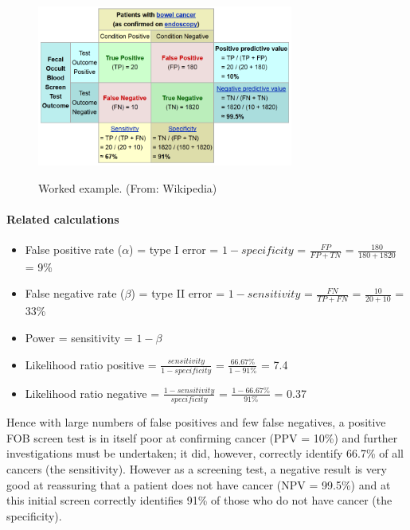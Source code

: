 \begin{figure}[ht]
  \centering
  \includegraphics[width=0.75\textwidth]{../Images/Sensitivity_Specificity_Example.png}\\
  \caption{Worked example. (From: Wikipedia)}\label{fig:sens_spec_example}
\end{figure}

\paragraph{Related calculations}

\begin{itemize}
  \item False positive rate ($\alpha$) = type I error = $1 - specificity$ = $\frac{FP}{FP + TN}$ = $\frac{180}{180+1820}$ = 9\%
  \item False negative rate ($\beta$) = type II error = $1 - sensitivity$ = $\frac{FN}{TP + FN}$ = $\frac{10}{20+10}$ = 33\%
  \item Power = sensitivity = $1−\beta$
  \item Likelihood ratio positive = $\frac{sensitivity}{1−specificity}$ = $\frac{66.67\%}{1−91\%}$ = 7.4
  \item Likelihood ratio negative = $\frac{1−sensitivity}{specificity}$ = $\frac{1−66.67\%}{91\%}$ = 0.37
\end{itemize}

Hence with large numbers of false positives and few false negatives, a positive FOB screen test is in itself poor at confirming cancer (PPV = 10\%) and further investigations must be undertaken; it did, however, correctly identify 66.7\% of all cancers (the sensitivity). However as a screening test, a negative result is very good at reassuring that a patient does not have cancer (NPV = 99.5\%) and at this initial screen correctly identifies 91\% of those who do not have cancer (the specificity).


